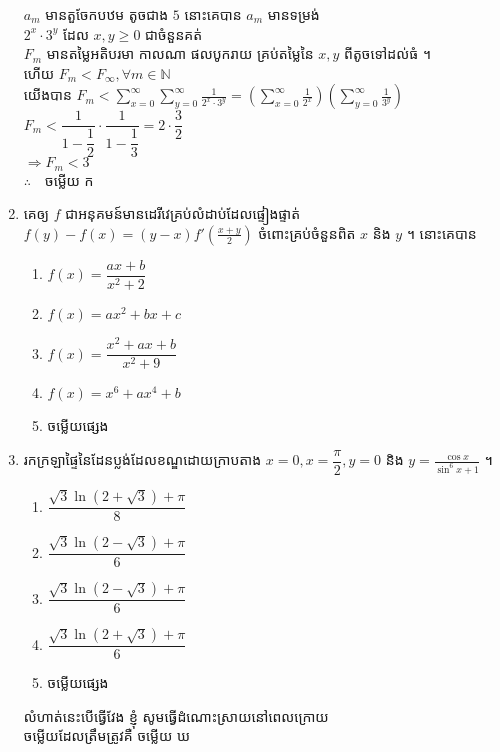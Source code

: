 \documentclass[12pt, a4paper]{article}
\begin{document}
\begin{enumerate}[m]
\begin{enumerate}[k,5]
	\end{enumerate}
	\answer
	\begin{center}
		$a_m$ មានតួចែកបឋម តូចជាង $5$ នោះគេបាន $a_m$ មានទម្រង់\\
		$2^x\cdot3^y$ ដែល $x,y\ge0$ ជាចំនួនគត់\\
		$F_m$ មានតម្លៃអតិបរមា កាលណា ផលបូករាយ គ្រប់តម្លៃនៃ $x,y$ ពីតូចទៅដល់ធំ ។\\
		ហើយ $F_m<F_\infty, \forall m\in\mathbb{N}$\\
		យើងបាន $F_m<\sum_{x=0}^{\infty}\sum_{y=0}^{\infty}\frac{1}{2^x\cdot3^y}=\left(\sum_{x=0}^{\infty}\frac{1}{2^x}\right)\left(\sum_{y=0}^{\infty}\frac{1}{3^y}\right)$\\ 
		$F_m<\dfrac{1}{1-\dfrac{1}{2}}\cdot\dfrac{1}{1-\dfrac{1}{3}}=2\cdot\dfrac{3}{2}$\\
		$\Rightarrow F_m<3$\\
		$\therefore \quad $\kml ចម្លើយ \kbk ក
	\end{center}
	{\color{blue}\hrulefill}
	\item គេឲ្យ $f$ ជាអនុគមន៍មានដេរីវេគ្រប់លំដាប់ដែលផ្ទៀងផ្ទាត់ $f(y)-f(x)=\left(y-x\right)f'\left(\frac{x+y}{2}\right)$ ចំពោះគ្រប់ចំនួនពិត $x$ និង $y$ ។ នោះគេបាន
	\begin{enumerate}[k,3]
		\item $f(x)=\dfrac{ax+b}{x^2+2}$
		\item $f(x)=ax^2+bx+c$
		\item $f(x)=\dfrac{x^2+ax+b}{x^2+9}$
		\item $f(x)=x^6+ax^4+b$
		\item ចម្លើយផ្សេង
	\end{enumerate}
	\answer
	{\color{blue}\hrulefill}
	\item រកក្រឡាផ្ទៃនៃដែនប្លង់ដែលខណ្ឌដោយក្រាបតាង $x=0,x=\dfrac{\pi}{2},y=0$ និង $y=\frac{\cos x}{\sin^6x+1}$ ។
	\begin{enumerate}[k,3]
		\item $\dfrac{\sqrt{3}\ln\left(2+\sqrt{3}\right)+\pi}{8}$
		\item $\dfrac{\sqrt{3}\ln\left(2-\sqrt{3}\right)+\pi}{6}$
		\item $\dfrac{\sqrt{3}\ln\left(2-\sqrt{3}\right)+\pi}{6}$
		\item $\dfrac{\sqrt{3}\ln\left(2+\sqrt{3}\right)+\pi}{6}$
		\item ចម្លើយផ្សេង
	\end{enumerate}
	\answer
	\begin{center}
		លំហាត់នេះបើធ្វើវែង ខ្ញុំ សូមធ្វើដំណោះស្រាយនៅពេលក្រោយ\\
		ចម្លើយដែលត្រឹមត្រូវគឺ \kml ចម្លើយ \kbk ឃ
	\end{center}
	{\color{blue}\hrulefill}
	\makeads
	\vspace{10pt}
	\centering \huge {}
\end{enumerate}
\end{document}
